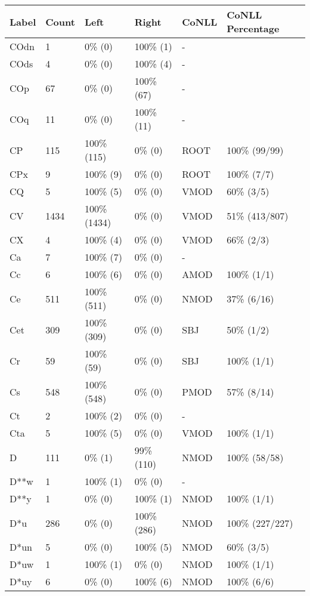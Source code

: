 \begin{figure*}
\begin{tabular}{|l|l|l|l||l|l|}
\hline
Label & Count & Left & Right & CoNLL & CoNLL Percentage\\ 
\hline
 COdn & 1 & 0\% (0) & 100\% (1) & - &  \\ 
\hline
 COds & 4 & 0\% (0) & 100\% (4) & - &  \\ 
\hline
 COp & 67 & 0\% (0) & 100\% (67) & - &  \\ 
\hline
 COq & 11 & 0\% (0) & 100\% (11) & - &  \\ 
\hline
 CP & 115 & 100\% (115) & 0\% (0) & ROOT & 100\% (99/99) \\ 
\hline
 CPx & 9 & 100\% (9) & 0\% (0) & ROOT & 100\% (7/7) \\ 
\hline
 CQ & 5 & 100\% (5) & 0\% (0) & VMOD & 60\% (3/5) \\ 
\hline
 CV & 1434 & 100\% (1434) & 0\% (0) & VMOD & 51\% (413/807) \\ 
\hline
 CX & 4 & 100\% (4) & 0\% (0) & VMOD & 66\% (2/3) \\ 
\hline
 Ca & 7 & 100\% (7) & 0\% (0) & - &  \\ 
\hline
 Cc & 6 & 100\% (6) & 0\% (0) & AMOD & 100\% (1/1) \\ 
\hline
 Ce & 511 & 100\% (511) & 0\% (0) & NMOD & 37\% (6/16) \\ 
\hline
 Cet & 309 & 100\% (309) & 0\% (0) & SBJ & 50\% (1/2) \\ 
\hline
 Cr & 59 & 100\% (59) & 0\% (0) & SBJ & 100\% (1/1) \\ 
\hline
 Cs & 548 & 100\% (548) & 0\% (0) & PMOD & 57\% (8/14) \\ 
\hline
 Ct & 2 & 100\% (2) & 0\% (0) & - &  \\ 
\hline
 Cta & 5 & 100\% (5) & 0\% (0) & VMOD & 100\% (1/1) \\ 
\hline
 D & 111 & 0\% (1) & 99\% (110) & NMOD & 100\% (58/58) \\ 
\hline
 D**w & 1 & 100\% (1) & 0\% (0) & - &  \\ 
\hline
 D**y & 1 & 0\% (0) & 100\% (1) & NMOD & 100\% (1/1) \\ 
\hline
 D*u & 286 & 0\% (0) & 100\% (286) & NMOD & 100\% (227/227) \\ 
\hline
 D*un & 5 & 0\% (0) & 100\% (5) & NMOD & 60\% (3/5) \\ 
\hline
 D*uw & 1 & 100\% (1) & 0\% (0) & NMOD & 100\% (1/1) \\ 
\hline
 D*uy & 6 & 0\% (0) & 100\% (6) & NMOD & 100\% (6/6) \\ 

\end{tabular}
\end{figure*}
